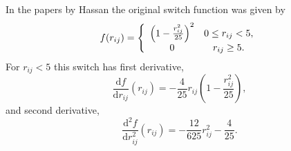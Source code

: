 \documentclass[a4paper,11pt,oneside]{article}
\begin{document}
In the papers by Hassan the original switch function was given by
\begin{equation}
f(r_{ij}) = \left\{
\begin{array}{c c}
\left(1-\frac{r_{ij}^2}{25}\right)^2 & 0\le r_{ij}<5,\\
0 & r_{ij}\ge 5.
\end{array}
\right.
\end{equation}
For $r_{ij} < 5$ this switch has first derivative,
\begin{equation}
\frac{\mathrm{d}f}{\mathrm{d}r_{ij}}(r_{ij}) =
-\frac{4}{25}r_{ij}\left(1-\frac{r_{ij}^2}{25}\right),
\end{equation}
and second derivative,
\begin{equation}
\frac{\mathrm{d}^2f}{\mathrm{d}r_{ij}^2}(r_{ij}) =
-\frac{12}{625}r_{ij}^2 -\frac{4}{25}.
\end{equation}
\end{document}

